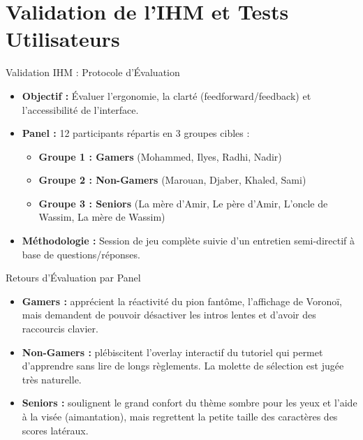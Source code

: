 \documentclass{beamer}
\begin{document}
\section{Validation de l'IHM et Tests Utilisateurs}

\begin{frame}{Validation IHM : Protocole d'Évaluation}
    \begin{itemize}
        \item \textbf{Objectif :} Évaluer l'ergonomie, la clarté (feedforward/feedback) et l'accessibilité de l'interface.
        \item \textbf{Panel :} 12 participants répartis en 3 groupes cibles :
        \begin{itemize}
            \item \textbf{Groupe 1 : Gamers} (Mohammed, Ilyes, Radhi, Nadir)
            \item \textbf{Groupe 2 : Non-Gamers} (Marouan, Djaber, Khaled, Sami)
            \item \textbf{Groupe 3 : Seniors} (La mère d'Amir, Le père d'Amir, L'oncle de Wassim, La mère de Wassim)
        \end{itemize}
        \item \textbf{Méthodologie :} Session de jeu complète suivie d'un entretien semi-directif à base de questions/réponses.
    \end{itemize}
\end{frame}

\begin{frame}{Retours d'Évaluation par Panel}
    \begin{itemize}
        \item \textbf{Gamers :} apprécient la réactivité du pion fantôme, l'affichage de Voronoï, mais demandent de pouvoir désactiver les intros lentes et d'avoir des raccourcis clavier.
        \item \textbf{Non-Gamers :} plébiscitent l'overlay interactif du tutoriel qui permet d'apprendre sans lire de longs règlements. La molette de sélection est jugée très naturelle.
        \item \textbf{Seniors :} soulignent le grand confort du thème sombre pour les yeux et l'aide à la visée (aimantation), mais regrettent la petite taille des caractères des scores latéraux.
    \end{itemize}
\end{frame}
\end{document}
